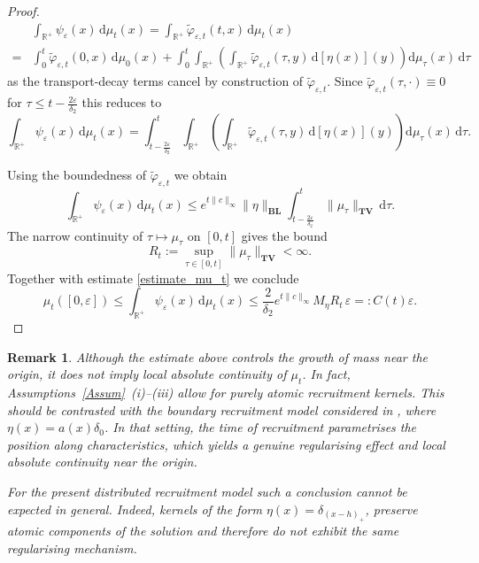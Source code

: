 \documentclass[12pt,a4paper]{amsart}
\newcommand{\ud}{\mathrm{d}}
\newtheorem{remark}[theorem]{Remark}
\newcommand{\BLN}{\mathbf{BL}}
\newcommand{\TV}{\mathbf{TV}}
\newcommand{\reali}{\mathbb{R}}
\newcommand{\R}{\mathbb{R}}
\begin{document}
\begin{proof}
    \begin{align*}
&\int_{\R^+}\psi_\varepsilon(x)\,\ud\mu_t(x)
=\int_{\R^+}\tilde\varphi_{\varepsilon,t}(t,x)\,\ud\mu_t(x)\\
\iffalse
=&\int_0^t\tilde\varphi_{\varepsilon,t}(0,x)\,\ud\mu_0(x)\\
&+\int_0^t \int_{\reali^+} \left(
   \partial_{\tau}\tilde\varphi_{\varepsilon,t}(\tau,x) + b(x) \; \partial_x
   \tilde\varphi_{\varepsilon,t}(t,x) - c(x) \; \tilde\varphi_{\varepsilon,t}(t,x) \right)\,\ud\mu_{\tau}(x)\,\ud{\tau}   \\
   &+\int_0^t
\int_{\R^+}
\left(
\int_{\R^+}
\tilde \varphi_{\varepsilon,t}(\tau,y)\,
\ud[\eta(x)](y)
\right)
\ud\mu_\tau(x)\,\ud\tau\\
\fi
=&\int_0^t\tilde\varphi_{\varepsilon,t}(0,x)\,\ud\mu_0(x)+
\int_0^t
\int_{\R^+}
\left(
\int_{\R^+}
\tilde \varphi_{\varepsilon,t}(\tau,y)\,
\ud[\eta(x)](y)
\right)
\ud\mu_\tau(x)\,\ud\tau
\end{align*}
as the transport-decay terms cancel
by construction of $\tilde \varphi_{\varepsilon,t}$. Since $\tilde \varphi_{\varepsilon,t}(\tau,\cdot)\equiv0$ for $\tau\leq t-\frac {2\varepsilon}{\delta_2}$ this reduces to
\[
\int_{\R^+}\psi_\varepsilon(x)\,\ud\mu_t(x)
=
\int_{t-\frac{2\varepsilon}{\delta_2}}^t
\int_{\R^+}
\left(
\int_{\R^+}
\tilde \varphi_{\varepsilon,t}(\tau,y)\,
\ud[\eta(x)](y)
\right)
\ud\mu_\tau(x)\,\ud\tau.
\]

\noindent Using the boundedness of $\tilde \varphi_{\varepsilon,t}$ we obtain
\[
\int_{\R^+}\psi_\varepsilon(x)\,\ud\mu_t(x)
\le
e^{t\|c\|_\infty}\|\eta\|_{\BLN}
\int_{t-\frac{2\varepsilon}{\delta_2}}^t
\|\mu_\tau\|_{\TV}\,\ud\tau.
\]
The narrow continuity of $\tau\mapsto\mu_\tau$ on $[0,t]$ gives the bound
\[
R_t:=
\sup_{\tau\in[0,t]}
\|\mu_\tau\|_{\TV}
<\infty.
\]
Together with estimate \eqref{estimate_mu_t} we conclude 
\[
\mu_t([0,\varepsilon])
\le
\int_{\R^+}\psi_\varepsilon(x)\,\ud\mu_t(x)
\le
\frac{2}{\delta_2}
e^{t\|c\|_\infty}
M_\eta R_t\,\varepsilon=:C(t)\varepsilon.
\]

\end{proof}

\begin{remark}
Although the estimate above controls the growth of mass near the origin, it does not imply local absolute continuity of $\mu_t$. In fact, Assumptions~\ref{Assum}~(i)--(iii) allow for purely atomic recruitment kernels. This should be contrasted with the boundary recruitment model considered in \cite[Lemma 2.20]{Duell_book}, where $\eta(x)=a(x)\delta_0$. In that setting, the time of recruitment parametrises the position along characteristics, which yields a genuine regularising effect and local absolute continuity near the origin.

\noindent For the present distributed recruitment model such a conclusion cannot be expected in general. Indeed, kernels of the form
$\eta(x)=\delta_{(x-h)_+}$, 
preserve atomic components of the solution and therefore do not exhibit the same regularising mechanism.
\end{remark}
\end{document}
